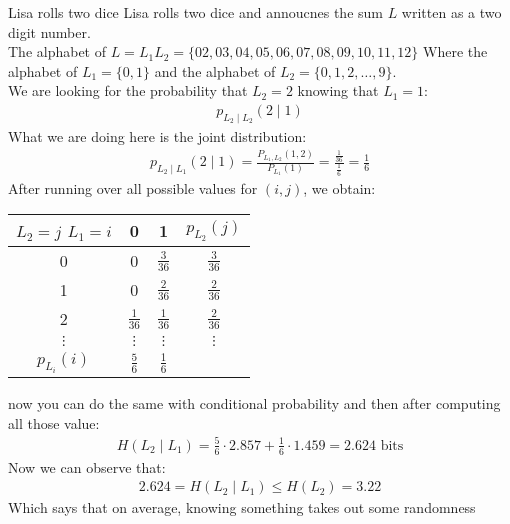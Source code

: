 \begin{parag}{Lisa rolls two dice}
    Lisa rolls two dice and annoucnes the sum $L$ written as a two digit number.
    \\
    The alphabet of $L = L_1L_2 = \{02, 03, 04, 05, 06, 07, 08, 09, 10, 11, 12\}$ Where the alphabet of $L_1 = \{0, 1\}$ and the alphabet of $L_2 = \{0, 1, 2, \dots, 9\}$.
    \\
    We are looking for the probability that $L_2 = 2$ knowing that $L_1 = 1$:
    \begin{align*}
        p_{L_2 \mid  L_2}(2 \mid  1)
    \end{align*}
    What we are doing here is the joint distribution:
    \begin{align*}
        p_{L_2 \mid  L_1}(2 \mid  1) = \frac{P_{L_1, L_2}(1, 2)}{P_{L_1}(1)} = \frac{ \frac{1}{36}}{ \frac{1}{6}} = \frac{1}{6}
    \end{align*}
    After running over all possible values for $(i, j)$, we obtain:
    \begin{center}
    \begin{tabular}{|c|c|c||c|}
        $L_2 = j$ $L_1 =i$ & 0 & 1 & $p_{L_2}(j)$ \\
        \hline 
        \hline
        0 & 0 & $\frac{3}{36}$ & $ \frac{3}{36}$ \\
        1 & 0 & $ \frac{2}{36}$& $ \frac{2}{36}$ \\
        2 & $ \frac{1}{36}$ & $ \frac{1}{36}$ & $ \frac{2}{36}$ \\
        $ \vdots$ &$ \vdots$ &$ \vdots$ &$ \vdots$ \\
        $p_{L_i}(i)$ & $ \frac{5}{6}$ & $ \frac{1}{6}$ & 
        \hline
    \end{tabular}
    \end{center}
    
   now you can do the same with conditional probability and then after computing all those value:
   \begin{align*}
       H(L_2 \mid  L_1) = \frac{5}{6} \cdot 2.857 + \frac{1}{6} \cdot 1.459 = 2.624 \text{ bits}
   \end{align*}
   Now we can observe that:
   \begin{align*}
       2.624 = H(L_2 \mid  L_1) \leq H(L_2) = 3.22
   \end{align*}
   Which says that on average, knowing something takes out some randomness
   
   
\end{parag}

